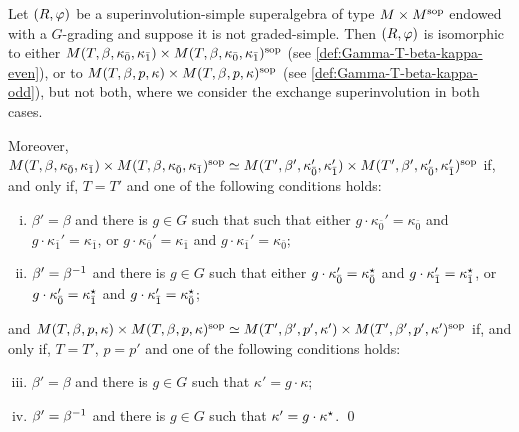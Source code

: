 \begin{thm}\label{thm:MxM-type-I}
    Let $(R, \varphi)$ be a superinvolution-simple superalgebra of type ${M\times M^{\mathrm{sop}}}$ endowed with a $G$-grading and suppose it is not graded-simple. 
    Then $(R, \varphi)$ is isomorphic to either $M(T, \beta, \kappa_{\bar{0}}, \kappa_{\bar{1}}) \times M(T, \beta, \kappa_{\bar{0}}, \kappa_{\bar{1}})^{\mathrm{sop}}$ (see \cref{def:Gamma-T-beta-kappa-even}), or to $M (T, \beta, p, \kappa) \times M (T, \beta, p, \kappa)^{\mathrm{sop}}$ (see \cref{def:Gamma-T-beta-kappa-odd}), but not both, where we consider the exchange superinvolution in both cases. 
    
    \noindent
    Moreover, $M(T, \beta, \kappa_{\bar{0}}, \kappa_{\bar{1}}) \times M(T, \beta, \kappa_{\bar{0}}, \kappa_{\bar{1}})^{\mathrm{sop}} \simeq M(T', \beta', \kappa_{\bar{0}}', \kappa_{\bar{1}}') \times M(T', \beta', \kappa_{\bar{0}}', \kappa_{\bar{1}}')^{\mathrm{sop}}$ if, and only if, $T = T'$ and one of the following conditions holds:
	\begin{enumerate}[(i)]
	    \item $\beta'=\beta$ and there is $g\in G$ such that such that either $g \cdot \kappa_{\bar 0}'=\kappa_{\bar 0}$ and $g \cdot \kappa_{\bar 1}'=\kappa_{\bar 1}$, or $g \cdot \kappa_{\bar 0}'=\kappa_{\bar 1}$ and $g \cdot \kappa_{\bar 1}'=\kappa_{\bar 0}$; 
	    \item $\beta'=\beta^{-1}$ and there is $g\in G$ such that either $g \cdot \kappa_{\bar 0}'=\kappa_{\bar 0}^\star$ and $g \cdot \kappa_{\bar 1}'=\kappa_{\bar 1}^\star$, or $g \cdot \kappa_{\bar 0}'=\kappa_{\bar 1}^\star$ and $g \cdot \kappa_{\bar 1}'=\kappa_{\bar 0}^\star$;
	\end{enumerate}
    and $M (T, \beta, p, \kappa) \times M (T, \beta, p, \kappa)^{\mathrm{sop}} \simeq M (T', \beta', p', \kappa') \times M (T', \beta', p', \kappa')^{\mathrm{sop}}$ if, and only if, $T = T'$, $p=p'$ and one of the following conditions holds:
    \begin{enumerate}[(i)]
        \setcounter{enumi}{2}
	    \item $\beta'=\beta$ and there is $g\in G$ such that $\kappa' = g \cdot \kappa$;
	    \item $\beta'=\beta^{-1}$ and there is $g\in G$ such that $\kappa' = g \cdot \kappa^\star$. \qed
	\end{enumerate}
\end{thm}

